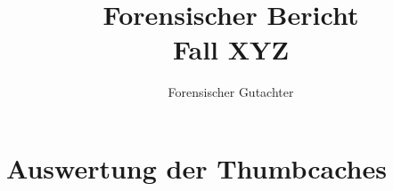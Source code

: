 \documentclass[11pt]{amsart}
\title{Forensischer Bericht\\Fall XYZ}
\author{Forensischer Gutachter}
\begin{document}
\maketitle



\section{Auswertung der Thumbcaches}


\end{document}
